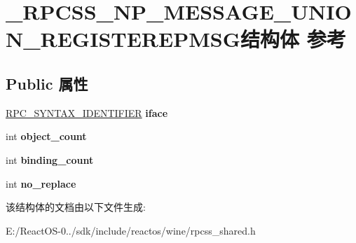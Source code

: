 \hypertarget{struct___r_p_c_s_s___n_p___m_e_s_s_a_g_e___u_n_i_o_n___r_e_g_i_s_t_e_r_e_p_m_s_g}{}\section{\+\_\+\+R\+P\+C\+S\+S\+\_\+\+N\+P\+\_\+\+M\+E\+S\+S\+A\+G\+E\+\_\+\+U\+N\+I\+O\+N\+\_\+\+R\+E\+G\+I\+S\+T\+E\+R\+E\+P\+M\+S\+G结构体 参考}
\label{struct___r_p_c_s_s___n_p___m_e_s_s_a_g_e___u_n_i_o_n___r_e_g_i_s_t_e_r_e_p_m_s_g}
\subsection*{Public 属性}
\begin{DoxyCompactItemize}
\item 
\mbox{\label{struct___r_p_c_s_s___n_p___m_e_s_s_a_g_e___u_n_i_o_n___r_e_g_i_s_t_e_r_e_p_m_s_g_a97ce483fa9506df80edbcca5d17ae0bb}} 
\hyperlink{struct___r_p_c___s_y_n_t_a_x___i_d_e_n_t_i_f_i_e_r}{R\+P\+C\+\_\+\+S\+Y\+N\+T\+A\+X\+\_\+\+I\+D\+E\+N\+T\+I\+F\+I\+ER} {\bfseries iface}
\item 
\mbox{\label{struct___r_p_c_s_s___n_p___m_e_s_s_a_g_e___u_n_i_o_n___r_e_g_i_s_t_e_r_e_p_m_s_g_adf0351424d6e5b03a0c64d1aa9e4f98b}} 
int {\bfseries object\+\_\+count}
\item 
\mbox{\label{struct___r_p_c_s_s___n_p___m_e_s_s_a_g_e___u_n_i_o_n___r_e_g_i_s_t_e_r_e_p_m_s_g_a5205ef64f2955c0e2447299bb3ac447e}} 
int {\bfseries binding\+\_\+count}
\item 
\mbox{\label{struct___r_p_c_s_s___n_p___m_e_s_s_a_g_e___u_n_i_o_n___r_e_g_i_s_t_e_r_e_p_m_s_g_ad869fecf98d0383c21a68585fc575728}} 
int {\bfseries no\+\_\+replace}
\end{DoxyCompactItemize}


该结构体的文档由以下文件生成\+:\begin{DoxyCompactItemize}
\item 
E\+:/\+React\+O\+S-\/0../sdk/include/reactos/wine/rpcss\+\_\+shared.\+h\end{DoxyCompactItemize}
